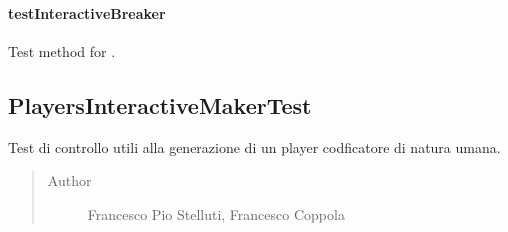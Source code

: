 \documentclass[letterpaper,10pt,italian,openany,oneside]{sphinxmanual}
\begin{document}
\paragraph{testInteractiveBreaker}
\label{\detokenize{test/it/unicam/cs/pa/mastermind/test/PlayersInteractiveBreakerTest:testinteractivebreaker}}

\begin{fulllineitems}
\label{\detokenize{test/it/unicam/cs/pa/mastermind/test/PlayersInteractiveBreakerTest:it.unicam.cs.pa.mastermind.test.PlayersInteractiveBreakerTest.testInteractiveBreaker()}}
Test method for .

\end{fulllineitems}



\subsection{PlayersInteractiveMakerTest}
\label{\detokenize{test/it/unicam/cs/pa/mastermind/test/PlayersInteractiveMakerTest:playersinteractivemakertest}}\label{\detokenize{test/it/unicam/cs/pa/mastermind/test/PlayersInteractiveMakerTest::doc}}

\begin{fulllineitems}
\label{\detokenize{test/it/unicam/cs/pa/mastermind/test/PlayersInteractiveMakerTest:it.unicam.cs.pa.mastermind.test.PlayersInteractiveMakerTest}}
Test di controllo utili alla generazione di un player codficatore di natura umana.
\begin{quote}\begin{description}
\item[{Author}] \leavevmode
Francesco Pio Stelluti, Francesco Coppola

\end{description}\end{quote}

\end{fulllineitems}
\end{document}
